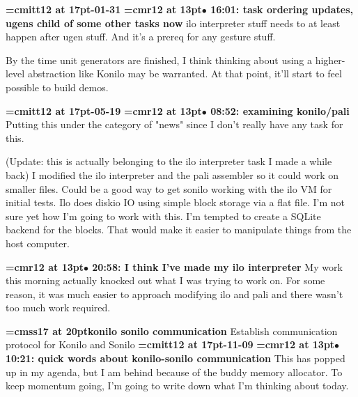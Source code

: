 {\medskip\noindent\bf\font\titlefont=cmitt12 at 17pt-01-31}\medskip
{\smallskip\noindent\bf\font\titlefont=cmr12 at 13pt\titlefont $\bullet$ 16:01: task ordering updates, ugens child of some other tasks now}\smallskip
ilo interpreter stuff needs to at least happen after ugen stuff. And it's a prereq for any gesture stuff.
\par

By the time unit generators are finished, I think thinking about using a higher-level abstraction like Konilo may be warranted. At that point, it'll start to feel possible to build demos.
\par

{\medskip\noindent\bf\font\titlefont=cmitt12 at 17pt-05-19}\medskip
{\smallskip\noindent\bf\font\titlefont=cmr12 at 13pt\titlefont $\bullet$ 08:52: examining konilo/pali}\smallskip
Putting this under the category of "news" since I don't really have any task for this.
\par

(Update: this is actually belonging to the ilo interpreter task I made a while back) I modified the ilo interpreter and the pali assembler so it could work on smaller files. Could be a good way to get sonilo working with the ilo VM for initial tests. Ilo does diskio IO using simple block storage via a flat file. I'm not sure yet how I'm going to work with this. I'm tempted to create a SQLite backend for the blocks. That would make it easier to manipulate things from the host computer.
\par

{\smallskip\noindent\bf\font\titlefont=cmr12 at 13pt\titlefont $\bullet$ 20:58: I think I've made my ilo interpreter}\smallskip
My work this morning actually knocked out what I was trying to work on. For some reason, it was much easier to approach modifying ilo and pali and there wasn't too much work required.
\par

{\medskip\noindent\bf\font\titlefont=cmss17 at 20pt\titlefont konilo sonilo communication}\medskip
Establish communication protocol for Konilo and Sonilo
{\medskip\noindent\bf\font\titlefont=cmitt12 at 17pt-11-09}\medskip
{\smallskip\noindent\bf\font\titlefont=cmr12 at 13pt\titlefont $\bullet$ 10:21: quick words about konilo-sonilo communication}\smallskip
This has popped up in my agenda, but I am behind because of the buddy memory allocator. To keep momentum going, I'm going to write down what I'm thinking about today.
\par

